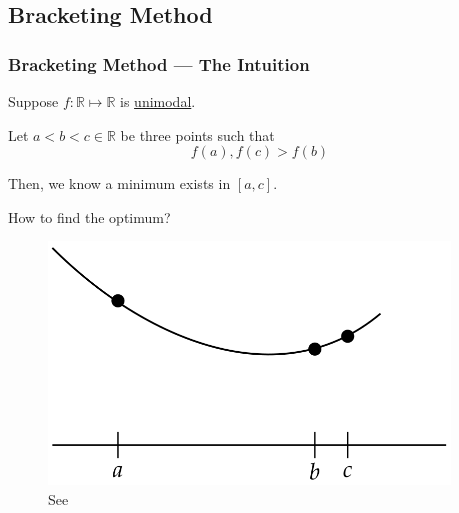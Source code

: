 \documentclass[11pt,xcolor={svgnames},aspectratio=169,usepdftitle=false]{beamer}
\let\toneitemize\itemize
\let\ttwoitemize\enditemize
\renewenvironment{itemize}{\toneitemize\addtolength{\itemsep}{0.7\baselineskip}}{\ttwoitemize}
\begin{document}
\subsection{Bracketing Method}

\begin{frame}
  \frametitle{Bracketing Method --- The Intuition}
  \begin{minipage}{0.49\textwidth}
    \begin{itemize}
      \item Suppose $f : \mathbb{R}\mapsto\mathbb{R}$ is \href{https://en.wikipedia.org/wiki/Unimodality\#Unimodal_function}{unimodal}.
      \item Let $a<b<c\in\mathbb{R}$ be three points such that
      \begin{equation}
        f(a), f(c) > f(b) \label{eqn:bracketing_criterion}
      \end{equation}
      \item Then, we know a minimum exists in $[a,c]$.
      \item How to find the optimum?
    \end{itemize}
  \end{minipage}
  \begin{minipage}{0.5\textwidth}
    \begin{figure}
      \includegraphics[width=0.95\textwidth]{../figures/optimization_bracketing.png}
      \caption{See \citet[Chapter~3]{kochenderfer2019optimization}}
    \end{figure}
  \end{minipage}
\end{frame}
\end{document}
